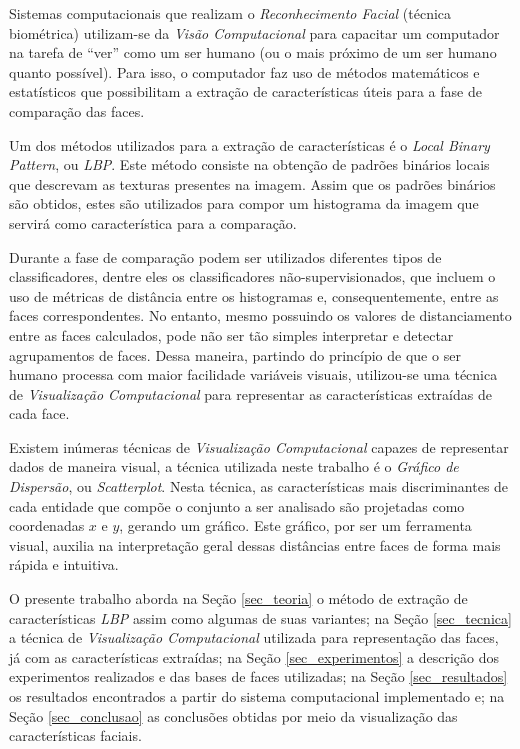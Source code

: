 \documentclass[conference]{IEEEtran}
\begin{document}
Sistemas computacionais que realizam o \textit{Reconhecimento Facial} (técnica biométrica) utilizam-se da \textit{Visão Computacional} para capacitar um computador na tarefa de ``ver'' como um ser humano (ou o mais próximo de um ser humano quanto possível). Para isso, o computador faz uso de métodos matemáticos e estatísticos que possibilitam a extração de características úteis para a fase de comparação das faces.

Um dos métodos utilizados para a extração de características é o \textit{Local Binary Pattern}, ou \textit{LBP}. Este método consiste na obtenção de padrões binários locais que descrevam as texturas presentes na imagem. Assim que os padrões binários são obtidos, estes são utilizados para compor um histograma da imagem que servirá como característica para a comparação.

Durante a fase de comparação podem ser utilizados diferentes tipos de classificadores, dentre eles os classificadores não-supervisionados, que incluem o uso de métricas de distância entre os histogramas e, consequentemente, entre as faces correspondentes. No entanto, mesmo possuindo os valores de distanciamento entre as faces calculados, pode não ser tão simples interpretar e detectar agrupamentos de faces. Dessa maneira, partindo do princípio de que o ser humano processa com maior facilidade variáveis visuais, utilizou-se uma técnica de \textit{Visualização Computacional} para representar as características extraídas de cada face.

Existem inúmeras técnicas de \textit{Visualização Computacional} capazes de representar dados de maneira visual, a técnica utilizada neste trabalho é o \textit{Gráfico de Dispersão}, ou \textit{Scatterplot}. Nesta técnica, as características mais discriminantes de cada entidade que compõe o conjunto a ser analisado são projetadas como coordenadas $x$ e $y$, gerando um gráfico. Este gráfico, por ser um ferramenta visual, auxilia na interpretação geral dessas distâncias entre faces de forma mais rápida e intuitiva.

O presente trabalho aborda na Seção \ref{sec_teoria} o método de extração de características \textit{LBP} assim como algumas de suas variantes; na Seção \ref{sec_tecnica} a técnica de \textit{Visualização Computacional} utilizada para representação das faces, já com as características extraídas; na Seção \ref{sec_experimentos} a descrição dos experimentos realizados e das bases de faces utilizadas; na Seção \ref{sec_resultados} os resultados encontrados a partir do sistema computacional implementado e; na Seção \ref{sec_conclusao} as conclusões obtidas por meio da visualização das características faciais.
\end{document}

